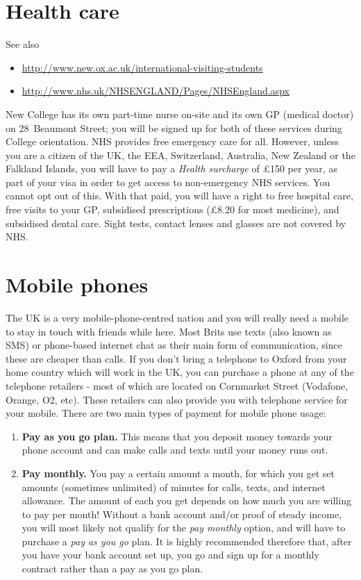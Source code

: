 \section{Health care}
See also 
\begin{itemize}
  \item \url{http://www.new.ox.ac.uk/international-visiting-students}
  \item \url{http://www.nhs.uk/NHSENGLAND/Pages/NHSEngland.aspx}
\end{itemize}

New College has its own part-time nurse on-site and its own GP (medical doctor) on 28~Beaumont Street; you will be signed up for both of these services during College orientation.  
NHS provides free emergency care for all. However, unless you are a citizen of
the UK, the EEA, Switzerland, Australia, New Zealand or the Falkland Islands,
you will have to pay a \emph{Health surcharge} of \pounds150 per year, as part of
your visa in order to get access to non-emergency NHS services. You cannot opt out of this.
With that paid, you will have a right to free hospital care, free visits to your
GP, subsidised prescriptions (\pounds8.20 for most medicine), and subsidised
dental care. Sight tests, contact lenses and glasses are not covered by NHS.


\section{Mobile phones} 

The UK is a very mobile-phone-centred nation and you will really need a mobile to stay in touch with friends while here. Most Brits use texts (also known as SMS) or phone-based internet chat as their main form of communication, since these are cheaper than calls. 
If you don't bring a telephone to Oxford from your home country which will work in the UK, you can purchase a phone at any of the telephone retailers - most of which are located on Cornmarket Street (Vodafone, Orange, O2, etc). These retailers can also provide you with telephone service for your mobile. There are two main types of payment for mobile phone usage:

\begin{enumerate}
  \item \textbf{Pay as you go plan.} This means that you deposit money
towards your phone account and can make calls and texts until your money runs out.
 \item \textbf{Pay monthly.}  You pay a certain amount a month, for which you
get set amounts (sometimes unlimited) of minutes for calls, texts, and internet
allowance. The amount of each you get depends on how much you are willing to pay
per month! Without a bank account and/or proof of steady income, you will most
likely not qualify for the \emph{pay monthly} option, and will have to purchase a
\emph{pay as you go} plan. It is highly recommended therefore that, after you
have your bank account set up, you go and sign up for a monthly contract rather than a pay as you go plan.
\end{enumerate}

